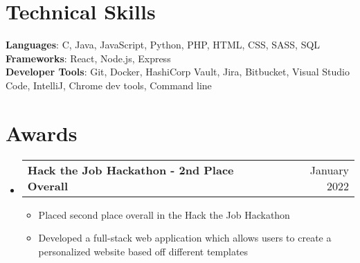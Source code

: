 \documentclass[letterpaper,11pt]{article}
\makeatletter
\newcommand{\resumeItem}[1]{
  \item\small{
    {#1 \vspace{-2pt}}
  }
}
\newcommand{\resumeAwardHeading}[2]{
  \vspace{-2pt}\item
    \begin{tabular*}{0.97\textwidth}[t]{l@{\extracolsep{\fill}}r}
      \textbf{#1} & #2 \\
    \end{tabular*}\vspace{-7pt}
}
\newcommand{\resumeSubHeadingListStart}{\begin{itemize}[leftmargin=0.15in, label={}]}
\newcommand{\resumeSubHeadingListEnd}{\end{itemize}}
\newcommand{\resumeItemListStart}{\begin{itemize}}
\newcommand{\resumeItemListEnd}{\end{itemize}\vspace{-5pt}}
\makeatother
\begin{document}
%
\section{Technical Skills}
 \begin{itemize}[leftmargin=0.15in, label={}]
    \small{\item{
     \textbf{Languages}{: C, Java, JavaScript, Python, PHP, HTML, CSS, SASS, SQL} \\
     \textbf{Frameworks}{: React, Node.js, Express } \\
     \textbf{Developer Tools}{: Git, Docker, HashiCorp Vault, Jira, Bitbucket, Visual Studio Code, IntelliJ, Chrome dev tools, Command line} \\
    }}
 \end{itemize}

 \section{Awards}
    \resumeSubHeadingListStart
    \resumeAwardHeading
      {Hack the Job Hackathon - 2nd Place Overall}{January 2022}
      \resumeItemListStart
        \resumeItem{Placed second place overall in the Hack the Job Hackathon}
        \resumeItem{Developed a full-stack web application which allows users to create a personalized website based off different templates}
      \resumeItemListEnd
        \resumeSubHeadingListEnd


\end{document}
